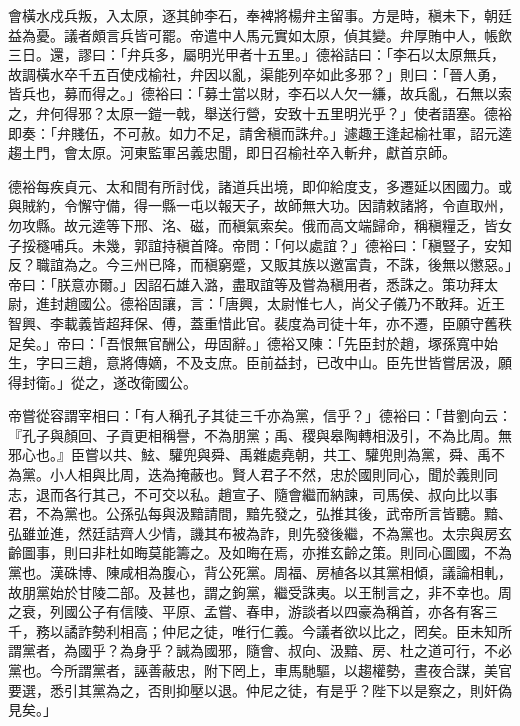 \begin{pinyinscope}
 會橫水戍兵叛，入太原，逐其帥李石，奉裨將楊弁主留事。方是時，稹未下，朝廷益為憂。議者頗言兵皆可罷。帝遣中人馬元實如太原，偵其變。弁厚賄中人，帳飲三日。還，謬曰：「弁兵多，屬明光甲者十五里。」德裕詰曰：「李石以太原無兵，故調橫水卒千五百使戍榆社，弁因以亂，渠能列卒如此多邪？」則曰：「晉人勇，皆兵也，募而得之。」德裕曰：「募士當以財，李石以人欠一縑，故兵亂，石無以索之，弁何得邪？太原一鎧一戟，舉送行營，安致十五里明光乎？」使者語塞。德裕即奏：「弁賤伍，不可赦。如力不足，請舍稹而誅弁。」遽趣王逢起榆社軍，詔元逵趨土門，會太原。河東監軍呂義忠聞，即日召榆社卒入斬弁，獻首京師。



 德裕每疾貞元、太和間有所討伐，諸道兵出境，即仰給度支，多遷延以困國力。或與賊約，令懈守備，得一縣一屯以報天子，故師無大功。因請敕諸將，令直取州，勿攻縣。故元逵等下邢、洺、磁，而稹氣索矣。俄而高文端歸命，稱稹糧乏，皆女子挼穟哺兵。未幾，郭誼持稹首降。帝問：「何以處誼？」德裕曰：「稹豎子，安知反？職誼為之。今三州已降，而稹窮蹙，又販其族以邀富貴，不誅，後無以懲惡。」帝曰：「朕意亦爾。」因詔石雄入潞，盡取誼等及嘗為稹用者，悉誅之。策功拜太尉，進封趙國公。德裕固讓，言：「唐興，太尉惟七人，尚父子儀乃不敢拜。近王智興、李載義皆超拜保、傅，蓋重惜此官。裴度為司徒十年，亦不遷，臣願守舊秩足矣。」帝曰：「吾恨無官酬公，毋固辭。」德裕又陳：「先臣封於趙，塚孫寬中始生，字曰三趙，意將傳嫡，不及支庶。臣前益封，已改中山。臣先世皆嘗居汲，願得封衛。」從之，遂改衛國公。



 帝嘗從容謂宰相曰：「有人稱孔子其徒三千亦為黨，信乎？」德裕曰：「昔劉向云：『孔子與顏回、子貢更相稱譽，不為朋黨；禹、稷與皋陶轉相汲引，不為比周。無邪心也。』臣嘗以共、鮌、驩兜與舜、禹雜處堯朝，共工、驩兜則為黨，舜、禹不為黨。小人相與比周，迭為掩蔽也。賢人君子不然，忠於國則同心，聞於義則同志，退而各行其己，不可交以私。趙宣子、隨會繼而納諫，司馬侯、叔向比以事君，不為黨也。公孫弘每與汲黯請間，黯先發之，弘推其後，武帝所言皆聽。黯、弘雖並進，然廷詰齊人少情，譏其布被為詐，則先發後繼，不為黨也。太宗與房玄齡圖事，則曰非杜如晦莫能籌之。及如晦在焉，亦推玄齡之策。則同心圖國，不為黨也。漢硃博、陳咸相為腹心，背公死黨。周福、房植各以其黨相傾，議論相軋，故朋黨始於甘陵二部。及甚也，謂之鉤黨，繼受誅夷。以王制言之，非不幸也。周之衰，列國公子有信陵、平原、孟嘗、春申，游談者以四豪為稱首，亦各有客三千，務以譎詐勢利相高；仲尼之徒，唯行仁義。今議者欲以比之，罔矣。臣未知所謂黨者，為國乎？為身乎？誠為國邪，隨會、叔向、汲黯、房、杜之道可行，不必黨也。今所謂黨者，誣善蔽忠，附下罔上，車馬馳驅，以趨權勢，晝夜合謀，美官要選，悉引其黨為之，否則抑壓以退。仲尼之徒，有是乎？陛下以是察之，則奸偽見矣。」




\end{pinyinscope}
